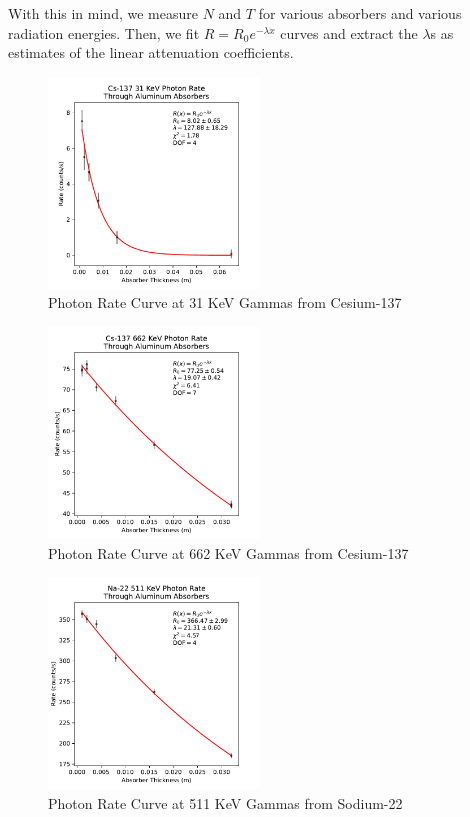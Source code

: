 \documentclass[12pt, letterpaper]{article}
\begin{document}
With this in mind, we measure $N$ and $T$ for various absorbers and various radiation energies. Then, we fit $R = R_0 e^{-\lambda x}$ curves and extract the $\lambda$s as estimates of the linear attenuation coefficients. 

\begin{figure}[h]
    \centering
    \includegraphics[width=0.5\textwidth]{experiment1/figures/cs137/rates-31.pdf}
    \caption{Photon Rate Curve at 31 KeV Gammas from Cesium-137}
    \label{fig:rates31}
\end{figure}

\begin{figure}[h]
    \centering
    \includegraphics[width=0.5\textwidth]{experiment1/figures/cs137/rates-662.pdf}
    \caption{Photon Rate Curve at 662 KeV Gammas from Cesium-137}
    \label{fig:rates662}
\end{figure}

\begin{figure}[h]
    \centering
    \includegraphics[width=0.5\textwidth]{experiment1/figures/na22/rates-511.pdf}
    \caption{Photon Rate Curve at 511 KeV Gammas from Sodium-22}
    \label{fig:rates511}
\end{figure}
\end{document}
